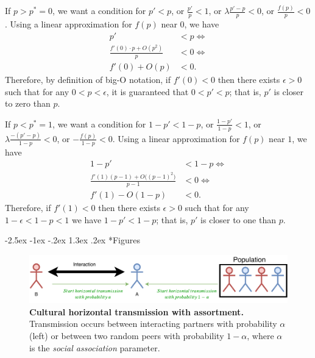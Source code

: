 \documentclass[12pt]{extarticle}
\makeatletter
\renewcommand\section{\@startsection {section}{1}{\z@}%
     {-2.5ex \@plus -1ex \@minus -.2ex}%
     {1.3ex \@plus.2ex}%
    {\Large\bfseries}}
\makeatother
\begin{document}
{\begin{appendices}
If $p>p^*=0$, we want a condition for $p'<p$, or
$\frac{p'}{p}<1$, or
$\lambda \frac{p'-p}{p} < 0$, or
$\frac{f(p)}{p} < 0$.
Using a linear approximation for $f(p)$ near $0$, we have
\begin{equation}\begin{aligned}
p' &< p \Leftrightarrow \\
\frac{f'(0) \cdot p + O(p^2)}{p} &< 0 \Leftrightarrow \\
f'(0) + O(p) &< 0.
\end{aligned}\end{equation}
Therefore, by definition of big-O notation, if $f'(0)<0$ then there exists $\epsilon>0$ such that for any $0<p<\epsilon$, it is guaranteed that $0<p'<p$; that is, $p'$ is closer to zero than $p$.

If $p<p^*=1$, we want a condition for $1-p' < 1-p$, or
$\frac{1-p'}{1-p}<1$, or
$\lambda \frac{-(p'-p)}{1-p} < 0$, or
$-\frac{f(p)}{1-p} < 0$.
Using a linear approximation for $f(p)$ near $1$, we have
\begin{equation}\begin{aligned}
1-p' &< 1-p  \Leftrightarrow \\
\frac{f'(1)(p-1) + O\big((p-1)^2\big)}{p-1} &< 0 \Leftrightarrow \\
f'(1) - O(1-p) &< 0.
\end{aligned}\end{equation}
Therefore, if $f'(1)<0$ then there exists $\epsilon>0$ such that for any $1-\epsilon<1-p<1$ we have $1-p'<1-p$; that is, $p'$ is closer to one than $p$.
\end{appendices}






\newpage
 
\section*{Figures}
\begin{figure}[thb]
  \centering
  \includegraphics[scale=1]{figure1.pdf}
  \caption{\textbf{Cultural horizontal transmission with assortment.} Transmission occurs between interacting partners with probability $\alpha$ (left) or between two random peers with probability $1-\alpha$, where $\alpha$ is the \emph{social association} parameter.
  }
  \label{fig:horizontal}
\end{figure}



}
\end{document}
